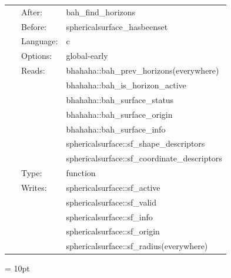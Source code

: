  \begin{tabular*}{160mm}{cll} 
~ & After:  & bah\_find\_horizons \\ 
~ & Before:  & sphericalsurface\_hasbeenset \\ 
~ & Language:  & c \\ 
~ & Options:  & global-early \\ 
~ & Reads:  & bhahaha::bah\_prev\_horizons(everywhere) \\ 
~& ~ &bhahaha::bah\_is\_horizon\_active\\ 
~& ~ &bhahaha::bah\_surface\_status\\ 
~& ~ &bhahaha::bah\_surface\_origin\\ 
~& ~ &bhahaha::bah\_surface\_info\\ 
~& ~ &sphericalsurface::sf\_shape\_descriptors\\ 
~& ~ &sphericalsurface::sf\_coordinate\_descriptors\\ 
~ & Type:  & function \\ 
~ & Writes:  & sphericalsurface::sf\_active \\ 
~& ~ &sphericalsurface::sf\_valid\\ 
~& ~ &sphericalsurface::sf\_info\\ 
~& ~ &sphericalsurface::sf\_origin\\ 
~& ~ &sphericalsurface::sf\_radius(everywhere)\\ 
\end{tabular*} 



\vspace{5mm}\parskip = 10pt 
